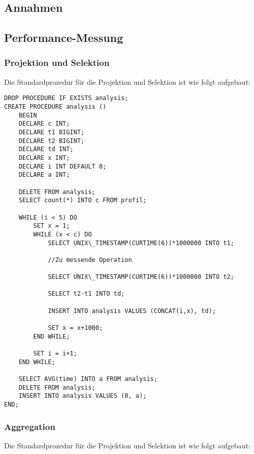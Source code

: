 \subsection{Annahmen}

\subsection{Performance-Messung}

\subsubsection{Projektion und Selektion}

Die Standardprozedur für die Projektion und Selektion ist wie folgt aufgebaut:

\begin{lstlisting}
DROP PROCEDURE IF EXISTS analysis;
CREATE PROCEDURE analysis ()
	BEGIN
	DECLARE c INT;
	DECLARE t1 BIGINT;
	DECLARE t2 BIGINT;
	DECLARE td INT;
	DECLARE x INT;
	DECLARE i INT DEFAULT 0;
	DECLARE a INT;
	
	DELETE FROM analysis;
	SELECT count(*) INTO c FROM profil;
	
	WHILE (i < 5) DO
		SET x = 1;
		WHILE (x < c) DO
			SELECT UNIX\_TIMESTAMP(CURTIME(6))*1000000 INTO t1;
			
			//Zu messende Operation
			
			SELECT UNIX\_TIMESTAMP(CURTIME(6))*1000000 INTO t2;
			
			SELECT t2-t1 INTO td;
			
			INSERT INTO analysis VALUES (CONCAT(i,x), td);
							
			SET x = x+1000;
		END WHILE;
			
		SET i = i+1;
	END WHILE;
	
	SELECT AVG(time) INTO a FROM analysis;
	DELETE FROM analysis;
	INSERT INTO analysis VALUES (0, a);
END;
\end{lstlisting}

\subsubsection{Aggregation}

Die Standardprozedur für die Projektion und Selektion ist wie folgt aufgebaut:

